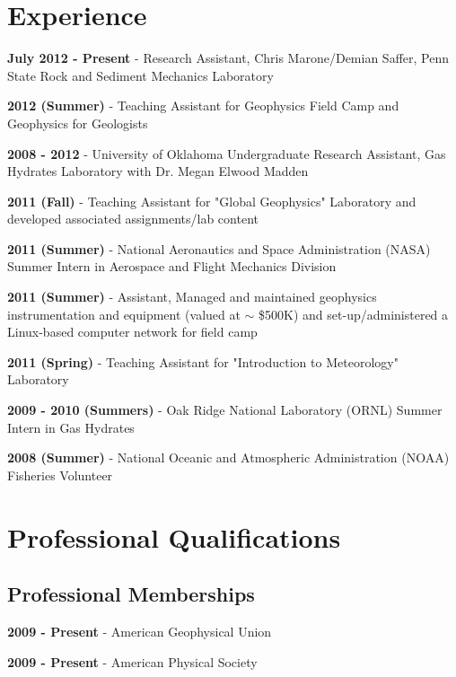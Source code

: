 \documentclass[letterpaper]{article}
\renewenvironment{itemize}{
  \begin{list}{}{
    \setlength{\leftmargin}{1.5em}
  }
}{
  \end{list}
}
\begin{document}
\section*{Experience}

\begin{itemize}
\item \textbf{July 2012 - Present} - Research Assistant, Chris Marone/Demian Saffer, Penn State Rock and Sediment Mechanics Laboratory
\item \textbf{2012 (Summer)} - Teaching Assistant for Geophysics Field Camp and Geophysics for Geologists
\item \textbf{2008 - 2012} - University of Oklahoma Undergraduate Research Assistant, Gas Hydrates Laboratory with Dr. Megan Elwood Madden
\item \textbf{2011 (Fall)} - Teaching Assistant for "Global Geophysics" Laboratory and developed associated assignments/lab content
\item \textbf{2011 (Summer)} - National Aeronautics and Space Administration (NASA) Summer Intern in Aerospace and Flight Mechanics Division
\item \textbf{2011 (Summer)} - Assistant, Managed and maintained geophysics instrumentation and equipment (valued at $\sim$ \$500K) and set-up/administered a Linux-based computer network for field camp
\item \textbf{2011 (Spring)} - Teaching Assistant for "Introduction to Meteorology" Laboratory
\item \textbf{2009 - 2010 (Summers)} - Oak Ridge National Laboratory (ORNL) Summer Intern in Gas Hydrates
\item \textbf{2008 (Summer)} - National Oceanic and Atmospheric Administration (NOAA) Fisheries Volunteer
\end{itemize}

\section*{Professional Qualifications}

\subsection*{Professional Memberships}
\begin{itemize}
\item \textbf{2009 - Present} - American Geophysical Union
\item \textbf{2009 - Present} - American Physical Society
\end{itemize}
\end{document}
